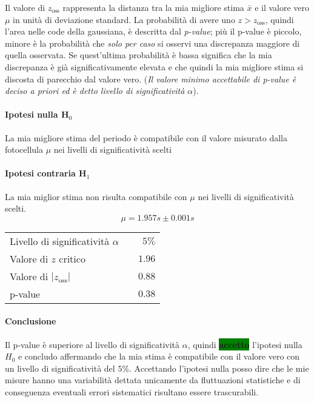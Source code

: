 \documentclass{article}
\begin{document}
	
	\noindent
	Il valore di $z_{\text{oss}}$ rappresenta la distanza tra la mia migliore stima $\bar{x}$ e il valore vero $\mu$ in unità di deviazione standard. La probabilità di avere uno $z > z_{\text{oss}}$, quindi l'area nelle code della gaussiana, è descritta dal \textit{p-value}; più il p-value è piccolo, minore è la probabilità che \textit{solo per caso} si osservi una discrepanza maggiore di quella osservata. Se quest'ultima probabilità è bassa significa che la mia discrepanza è già significativamente elevata e che quindi la mia migliore stima si discosta di parecchio dal valore vero.
	(\textit{Il valore minimo accettabile di p-value è deciso a priori ed è detto livello di significatività $\alpha$}).
	
	\paragraph{Ipotesi nulla H$_{0}$} La mia migliore stima del periodo è compatibile con il valore misurato dalla fotocellula $\mu$ nei livelli di significatività scelti	
	\paragraph{Ipotesi contraria H$_{1}$} La mia miglior stima non risulta compatibile con $\mu$ nei livelli di significatività scelti.
	\[
	\mu = 1.957s \pm 0.001 s
	\]
	\begin{table}[H]
		\centering
		\begin{tabular}{lr}
			Livello di significatività $\alpha$		& $ \quad 5\%$  \\
			Valore di $z$ critico     & $\quad 1.96$ \\
			Valore di $|z_{\text{oss}}|$      & $\quad 0.88$ \\
			p-value     & $\quad 0.38$
		\end{tabular}
	\end{table}



	\paragraph{Conclusione}\label{para}  Il p-value è superiore al livello di significatività $\alpha$, quindi \colorbox{green}{\textbf{accetto}} l'ipotesi nulla $H_{0}$ e concludo affermando che la mia stima è compatibile con il valore vero con un livello di significatività del $5\%$. Accettando l'ipotesi nulla posso dire che le mie misure hanno una variabilità dettata unicamente da fluttuazioni statistiche e di conseguenza eventuali  errori sistematici risultano essere trascurabili.
	
\end{document}
